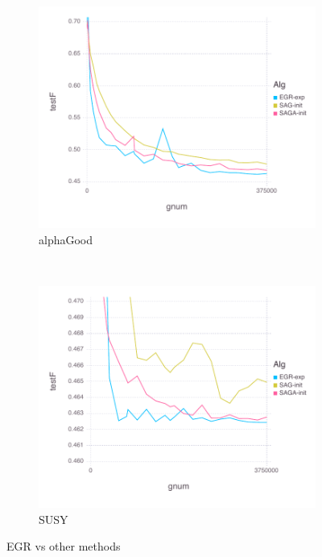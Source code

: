 \documentclass[11pt]{article}
\begin{document}
   \begin{figure}[H]
       \centering
       \begin{subfigure}[b]{0.45\textwidth}
           \includegraphics[width=\textwidth]{Figures/alphaGoodBLtrueFfFinal-g.pdf}
           \caption{alphaGood}
       \end{subfigure}
       ~ %
         \begin{subfigure}[b]{0.45\textwidth}
           \includegraphics[width=\textwidth]{Figures/SUSYBLtrueFfFinal-g.pdf}
             \caption{SUSY}
         \end{subfigure}
       \caption{EGR vs other methods}\label{fig:alphaGoodom}
   \end{figure}
   
\end{document}
